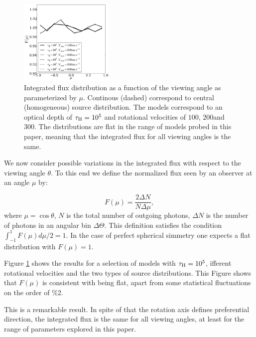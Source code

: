 \documentclass{emulateapj}
\newcommand{\kms}{{\ifmmode{{\mathrm{\,km\ s}^{-1}}}\else{\,km~s$^{-1}$}\fi}}
\begin{document}
\begin{figure}
\begin{center}
  \includegraphics[width=0.4\textwidth]{f5.pdf}
\end{center}
\caption{Integrated flux distribution as a function of the
  viewing angle as parameterized by $\mu$. Continous (dashed)
  correspond to central (homogeneous) source distribution.
  The models correspond to an optical depth of $\tau_{\rm
    H}=10^5$ and rotational velocities of $100$\kms, $200$\kms and
  $300$\kms. The distributions are flat in the range of models probed
  in this paper, meaning that the integrated flux for all viewing
  angles is the same.
\label{fig:muhisto}} 
\end{figure}

We now consider possible variations in the integrated flux with
respect to the viewing angle $\theta$. 
To this end we  define the normalized flux seen by an observer at an
angle $\mu$ by:  


\begin{equation}
F(\mu) = \frac{2\Delta N}{N\Delta \mu}, 
\end{equation} 
%
where $\mu=\cos\theta$, $N$ is the total number of outgoing photons,
$\Delta N$ is the number of photons in an angular bin $\Delta
\Theta$. This definition satisfies the condition
$\int_{-1}^{1}F(\mu)d\mu/2=1$.  In the case of perfect spherical
simmetry one expects a flat distribution with $F(\mu)=1$.

Figure \ref{fig:muhisto} shows the results for a selection of models
with $\tau_{\rm H}=10^{5}$, ifferent rotational velocities and the two
types of source distributions.
This Figure shows that $F(\mu)$ is consistent with being flat, apart
from some statistical fluctuations on the order of \%2. 


This is a remarkable result. 
In spite of that the rotation axis defines preferential direction, the
integrated flux is the same for all viewing angles, at least for the
range of parameters explored in this paper. 
\end{document}
